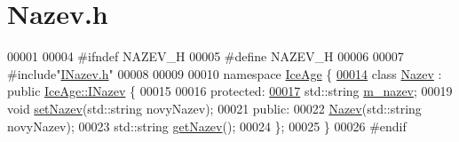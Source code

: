 \hypertarget{Nazev_8h_source}{}\section{Nazev.\+h}
\label{Nazev_8h_source}

\begin{DoxyCode}
00001 
00004 \textcolor{preprocessor}{#ifndef NAZEV\_H}
00005 \textcolor{preprocessor}{#define NAZEV\_H}
00006 
00007 \textcolor{preprocessor}{#include"\hyperlink{INazev_8h}{INazev.h}"}
00008 
00009 
00010 \textcolor{keyword}{namespace }\hyperlink{namespaceIceAge}{IceAge} \{
\hypertarget{Nazev_8h_source.tex_l00014}{}\hyperlink{classIceAge_1_1Nazev}{00014}     \textcolor{keyword}{class }\hyperlink{classIceAge_1_1Nazev}{Nazev} : \textcolor{keyword}{public} \hyperlink{classIceAge_1_1INazev}{IceAge::INazev} \{
00015 
00016     \textcolor{keyword}{protected}:
\hypertarget{Nazev_8h_source.tex_l00017}{}\hyperlink{classIceAge_1_1Nazev_a247a9f15b6c2f5ee361570530b75b8ce}{00017}         std::string \hyperlink{classIceAge_1_1Nazev_a247a9f15b6c2f5ee361570530b75b8ce}{m\_nazev}; 
00019         \textcolor{keywordtype}{void} \hyperlink{classIceAge_1_1Nazev_ad5ad071231518f88e0699ac668d73b99}{setNazev}(std::string novyNazev);
00021     \textcolor{keyword}{public}:
00022         \hyperlink{classIceAge_1_1Nazev_a633e5ae710d8d9e8fcf043bcf9e3d6d0}{Nazev}(std::string novyNazev);
00023         std::string \hyperlink{classIceAge_1_1Nazev_a09fcdd11a072b4a133cab63cdb4961a0}{getNazev}();
00024     \};
00025 \}
00026 \textcolor{preprocessor}{#endif}
\end{DoxyCode}
